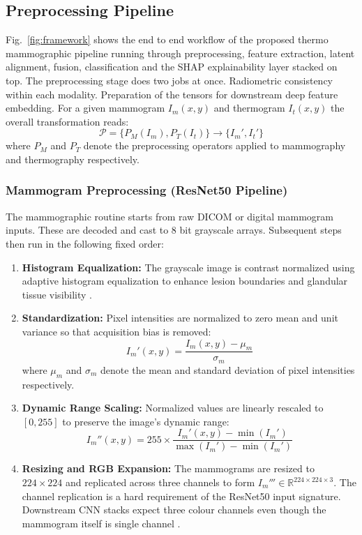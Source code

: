 \documentclass[lettersize,journal]{IEEEtran}
\begin{document}
\subsection{Preprocessing Pipeline}
Fig.~\ref{fig:framework} shows the end to end workflow of the proposed thermo mammographic pipeline running through preprocessing, feature extraction, latent alignment, fusion, classification and the SHAP explainability layer stacked on top.
The preprocessing stage does two jobs at once. Radiometric consistency within each modality. Preparation of the tensors for downstream deep feature embedding. For a given mammogram $I_m(x,y)$ and thermogram $I_t(x,y)$ the overall transformation reads:
\begin{equation}
\mathcal{P} = \{P_M(I_m), P_T(I_t)\} \rightarrow \{I_m', I_t'\}
\label{eq:preproc_set}
\end{equation}
where $P_M$ and $P_T$ denote the preprocessing operators applied to mammography and thermography respectively.

\subsubsection{Mammogram Preprocessing (ResNet50 Pipeline)}

The mammographic routine starts from raw DICOM or digital mammogram inputs. These are decoded and cast to 8 bit grayscale arrays. Subsequent steps then run in the following fixed order:

\begin{enumerate}
    \item \textbf{Histogram Equalization:} The grayscale image is contrast normalized using adaptive histogram equalization to enhance lesion boundaries and glandular tissue visibility \cite{Pizer1987CLAHE}.
    \item \textbf{Standardization:} Pixel intensities are normalized to zero mean and unit variance so that acquisition bias is removed:
    \begin{equation}
    I_m'(x,y) = \frac{I_m(x,y) - \mu_m}{\sigma_m}
    \label{eq:mammo_norm_code}
    \end{equation}
    where $\mu_m$ and $\sigma_m$ denote the mean and standard deviation of pixel intensities respectively.
    \item \textbf{Dynamic Range Scaling:} Normalized values are linearly rescaled to $[0,255]$ to preserve the image's dynamic range:
    \begin{equation}
    I_m''(x,y) = 255 \times \frac{I_m'(x,y) - \min(I_m')}{\max(I_m') - \min(I_m')}
    \label{eq:mammo_rescale}
    \end{equation}
    \item \textbf{Resizing and RGB Expansion:} The mammograms are resized to $224\times224$ and replicated across three channels to form $I_m''' \in \mathbb{R}^{224\times224\times3}$. The channel replication is a hard requirement of the ResNet50 input signature. Downstream CNN stacks expect three colour channels even though the mammogram itself is single channel \cite{He2016ResNet}.
\end{enumerate}
\end{document}
